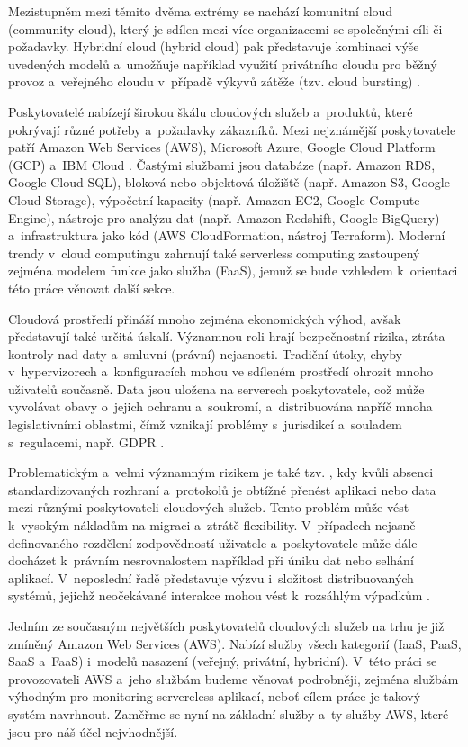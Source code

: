 \documentclass[czech, ing, kiv, he, iso690]{fasthesis}
\begin{document}
Mezistupněm mezi těmito dvěma extrémy se nachází komunitní cloud (community cloud), který je sdílen mezi více organizacemi se společnými cíli či požadavky. Hybridní cloud (hybrid cloud) pak představuje kombinaci výše uvedených modelů a~umožňuje například využití privátního cloudu pro běžný provoz a~veřejného cloudu v~případě výkyvů zátěže (tzv. cloud bursting) \cite{cloud_patterns}.

Poskytovatelé nabízejí širokou škálu cloudových služeb a~produktů, které pokrývají různé potřeby a~požadavky zákazníků. Mezi nejznámější poskytovatele patří Amazon Web Services (AWS), Microsoft Azure, Google Cloud Platform (GCP) a~IBM Cloud \cite{cloud_theory_practice}. Častými službami jsou databáze (např. Amazon RDS, Google Cloud SQL), bloková nebo objektová úložiště (např. Amazon S3, Google Cloud Storage), výpočetní kapacity (např. Amazon EC2, Google Compute Engine), nástroje pro analýzu dat (např. Amazon Redshift, Google BigQuery) a~infrastruktura jako kód (AWS CloudFormation, nástroj Terraform). Moderní trendy v~cloud computingu zahrnují také serverless computing zastoupený zejména modelem funkce jako služba (FaaS), jemuž se bude vzhledem k~orientaci této práce věnovat další sekce.

Cloudová prostředí přináší mnoho zejména ekonomických výhod, avšak představují také určitá úskalí. Významnou roli hrají bezpečnostní rizika, ztráta kontroly nad daty a~smluvní (právní) nejasnosti. Tradiční útoky, chyby v~hypervizorech a~konfiguracích mohou ve sdíleném prostředí ohrozit mnoho uživatelů současně. Data jsou uložena na serverech poskytovatele, což může vyvolávat obavy o~jejich ochranu a~soukromí, a~distribuována napříč mnoha legislativními oblastmi, čímž vznikají problémy s~jurisdikcí a~souladem s~regulacemi, např. GDPR \cite{cloud_theory_practice}. 

Problematickým a~velmi významným rizikem je také tzv. , kdy kvůli absenci standardizovaných rozhraní a~protokolů je obtížné přenést aplikaci nebo data mezi různými poskytovateli cloudových služeb. Tento problém může vést k~vysokým nákladům na migraci a~ztrátě flexibility. V~případech nejasně definovaného rozdělení zodpovědností uživatele a~poskytovatele může dále docházet k~právním nesrovnalostem například při úniku dat nebo selhání aplikací. V~neposlední řadě představuje výzvu i~složitost distribuovaných systémů, jejichž neočekávané interakce mohou vést k~rozsáhlým výpadkům \cite{cloud_theory_practice}.

Jedním ze současným největších poskytovatelů cloudových služeb na trhu je již zmíněný Amazon Web Services (AWS). Nabízí služby všech kategorií (IaaS, PaaS, SaaS a~FaaS) i~modelů nasazení (veřejný, privátní, hybridní). V~této práci se provozovateli AWS a~jeho službám budeme věnovat podrobněji, zejména službám výhodným pro monitoring servereless aplikací, neboť cílem práce je takový systém navrhnout. Zaměřme se nyní na základní služby a~ty služby AWS, které jsou pro náš účel nejvhodnější.
\end{document}

